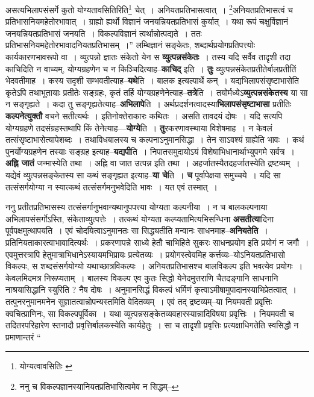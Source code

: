 \documentclass[article,12pt,a4paper]{memoir}
\begin{document}
	असत्यभिलापसंसर्गे कुतो योग्यतावसितिरिति\footnote{योग्यत्वावसितिः \cite{dp-msC} \cite{dp-msD} \cite{dp-msB}} चेत् । अनियतप्रतिभासत्वात् । \footnote{ननु च विकल्पज्ञानस्यानियतप्रतिभासित्वमेव न सिद्धम्--\cite{dp-msD-n}}अनियतप्रतिभासत्वं च प्रतिभासनियमहेतोरभावात् । ग्राह्यो ह्यर्थो विज्ञानं जनयन्नियतप्रतिभासं कुर्यात् । यथा रूपं चक्षुर्विज्ञानं जनयन्नियतप्रतिभासं जनयति । विकल्पविज्ञानं त्वर्थान्नोत्पद्यते । ततः प्रतिभासनियमहेतोरभावादनियतप्रतिभासम् ।” लम्बिज्ञानं सङ्केतः, शब्दार्थप्रयोगप्रतिपत्त्योः कार्यकारणभावरूपो वा । व्युत्पन्नो ज्ञातः संकेतो येन स \textbf{व्युत्पन्नसंकेतः} । तस्य यदि सर्वैव तादृशी तदा काचिदिति न वाच्यम्, योग्यग्रहणेन च न किञ्चिदित्याह--\textbf{काचिद्} इति । \textbf{तुः} व्युत्पन्नसंकेतप्रतीतेर्बालप्रतीतिं भेदवतीमाह । कस्य सदृशी सम्भवतीत्याह--\textbf{यथे}ति । बालक इत्यल्पार्थे कन् । यद्यभिलापसंसृष्टाभासेति कृतेऽपि तथाभूतायाः प्रतीतेः सङ्ग्रहः, कृतं तर्हि योग्यग्रहणेनेत्याह--\textbf{तत्रे}ति । तयोर्मध्येऽ\textbf{व्युत्पन्नसंकेतस्य} या सा न सङ्गृह्यते । कदा तु सङ्गृह्यतेत्याह--\textbf{अभिलापे}ति । अर्थप्रदर्शनत्वादस्या\textbf{भिलापसंसृष्टाभासा} प्रतीतिः \textbf{कल्पनेत्युक्तौ} वचने सतीत्यर्थः । इतिनोक्तेराकारः कथितः । असति तावदयं दोषः । यदि सत्यपि योग्यग्रहणे तदसंग्रहस्तथापि किं तेनेत्याह—\textbf{योग्ये}ति । \textbf{तु}रकरणावस्थाया विशेषमाह । न केवलं तत्संसृष्टाभासेत्यापेशब्दः । तथाविधबालस्य च कल्पनाऽनुमानसिद्धा । तेन साऽवश्यं ग्राह्येति भावः । कथं पुनर्योग्यग्रहणेन तस्याः सङ्ग्रह इत्याह--\textbf{यद्यपी}ति । निपातसमुदायोऽयं विशेषाभिधानार्थाभ्युपगमे सर्वत्र । \textbf{अह्नि जातं} जन्मास्येति तथा । अह्नि वा जात उत्पन्न इति तथा । अहर्जातस्यैतदहर्जातस्येति द्रष्टव्यम् । यद्येवं व्युत्पन्नसङ्केतस्य सा कथं सङ्गृह्यत इत्याह--\textbf{या चे}ति । \textbf{च} पूर्वापेक्षया समुच्चये । यदि सा तत्संसर्गयोग्या न स्यात्कथं तत्संसर्गमनुभवेदिति भावः । यत एवं तस्मात् ।
	\pend
      

	  \pstart ननु प्रतीतप्रतिभासस्य तत्संसर्गानुभवान्यथानुपपत्त्या योग्यता कल्पनीया । न च बालकल्पनाया अभिलापसंसर्गोऽस्ति, संकेताव्युत्पत्तेः । तत्कथं योग्यता कल्प्यतामित्यभिसन्धिना \textbf{असतीत्या}दिना पूर्वपक्षमुत्थापयति । एवं चोदयित्वाऽनुमानतः सा सिद्ध्यतीति मन्वानः साधनमाह--\textbf{अनियतेति} । प्रतिनियताकारत्वाभावादित्यर्थः । प्रकरणापन्ने साध्ये हेतौ चाभिहिते सुकरः साधनप्रयोग इति प्रयोगं न जगौ । एवमुत्तरत्रापि हेतुमात्राभिधानेऽस्यायमभिप्रायः प्रत्येतव्यः । प्रयोगस्त्वेवमिह कर्त्तव्यः--योऽनियतप्रतिभासो विकल्पः, स शब्दसंसर्गयोग्यो यथाच्छात्रविकल्पः । अनियतप्रतिभासश्च बालविकल्प इति भवत्येव प्रयोगः । केवलमिदमत्र निरूप्यताम् । बालस्य विकल्प एव कुतः सिद्धो येनेदमुत्तराणि चैतदङ्गानि साधनानि ना\leavevmode{}श्रयासिद्धानि स्युरिति ? नैष दोषः । अनुमानसिद्धं विकल्पं धर्मिणं कृत्वाऽमीषामुपादानस्याभिप्रेतत्वात् । तत्पुनरनुमानमनेन सुज्ञातत्वान्नोपन्यस्तमिति वेदितव्यम् । एवं तद् द्रष्टव्यम्--या नियमवती प्रवृत्तिः क्वचित्प्राणिनः, सा विकल्पपूर्विका । यथा व्युत्पन्नसङ्केतव्यवहारस्यान्नादिविषया प्रवृत्तिः । नियमवती च तदितरपरिहारेण स्तनादौ प्रवृत्तिर्बालकस्येति कार्यहेतुः । सा च तादृशी प्रवृत्तिः प्रत्यक्षाधिगतेति स्वसिद्धौ न प्रमाणान्तरं  \leavevmode{} “
	  
\end{document}
